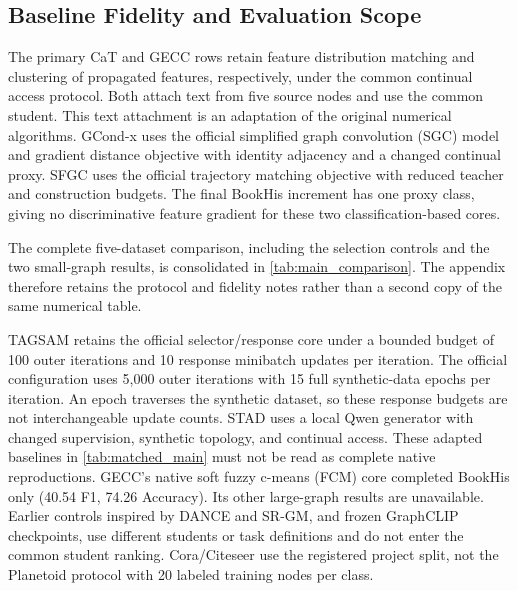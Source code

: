 \subsection{Baseline Fidelity and Evaluation Scope}

The primary CaT and GECC rows retain feature distribution matching and
clustering of propagated features, respectively, under the common
continual access protocol. Both attach text from five source nodes and use
the common student. This text attachment is an adaptation of the original
numerical algorithms. GCond-x uses the official simplified graph convolution
(SGC) model and gradient distance objective with identity adjacency and a
changed continual proxy. SFGC uses the official trajectory matching
objective with reduced teacher and construction budgets.
The final BookHis increment has one proxy class, giving no discriminative
feature gradient for these two classification-based cores.

The complete five-dataset comparison, including the selection controls and the
two small-graph results, is consolidated in \autoref{tab:main_comparison}.
The appendix therefore retains the protocol and fidelity notes rather than a
second copy of the same numerical table.

TAGSAM retains the official selector/response core under a bounded budget
of 100 outer iterations and 10 response minibatch updates per iteration.
The official configuration uses 5,000 outer iterations with 15 full
synthetic-data epochs per iteration. An epoch traverses the synthetic
dataset, so these response budgets are not interchangeable update counts.
STAD uses a local Qwen generator with changed supervision, synthetic
topology, and continual access. These adapted baselines in
\autoref{tab:matched_main} must not be read as complete native
reproductions. GECC's native soft fuzzy c-means (FCM) core completed BookHis
only (40.54 F1, 74.26 Accuracy).
Its other large-graph results are unavailable.
Earlier controls inspired by DANCE and SR-GM, and frozen GraphCLIP checkpoints,
use different students or task definitions and do not enter the common student
ranking. Cora/Citeseer use the registered project split, not the Planetoid
protocol with 20 labeled training nodes per class.

